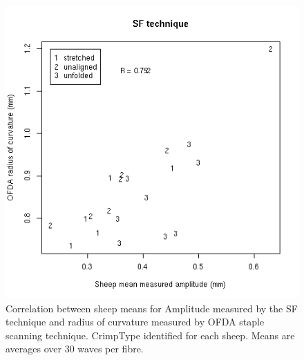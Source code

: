 %

\begin{figure}[!h]
  \centering
  \includegraphics[width=1.0\textwidth]{figofdaradsfampl.png}
  \caption{Correlation between sheep means for Amplitude measured by the SF technique and radius of curvature measured by OFDA staple scanning technique. CrimpType identified for each sheep. Means are averages over 30 waves per fibre.}
  \label{fig:ofdaradsfampl}
\end{figure}

%

